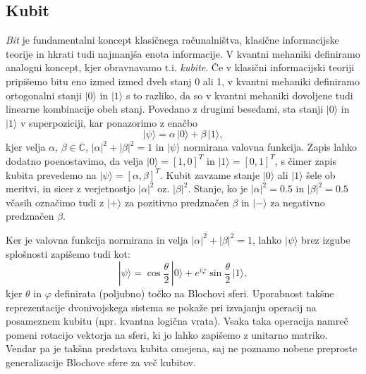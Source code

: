 \documentclass[12pt]{article}
\begin{document}
\subsection{Kubit}
\label{kubit} 

\emph{Bit} je fundamentalni koncept klasičnega računalništva, klasične informacijske teorije in hkrati tudi najmanjša enota informacije. V kvantni mehaniki definiramo analogni koncept, kjer obravnavamo t.i. \emph{kubite}. Če v klasični informacijski teoriji pripišemo bitu eno izmed izmed dveh stanj 0 ali 1, v kvantni mehaniki definiramo ortogonalni stanji $| 0 \rangle$ in $| 1 \rangle$ s to razliko, da so v kvantni mehaniki dovoljene tudi linearne kombinacije obeh stanj. Povedano z drugimi besedami, sta stanji $| 0 \rangle$ in $| 1 \rangle$ v superpoziciji, kar ponazorimo z enačbo
%
\begin{equation}
| \psi \rangle = \alpha \, | 0 \rangle + \beta \, | 1 \rangle,
\end{equation}
%
kjer velja $\alpha$, $\beta \in \mathbb{C}$, $|\alpha|^2 + |\beta|^2 = 1$ in $| \psi \rangle$ normirana valovna funkcija. Zapis lahko dodatno poenostavimo, da velja $| 0 \rangle = [1,0]^T$ in $| 1 \rangle = [0,1]^T$, s čimer zapis kubita prevedemo na $| \psi \rangle = [\alpha, \beta]^T$.  Kubit zavzame stanje $| 0 \rangle$ ali $| 1 \rangle$ šele ob meritvi, in sicer z verjetnostjo $|\alpha|^2$ oz. $|\beta|^2$. Stanje, ko je $|\alpha|^2 = 0.5$ in $|\beta|^2 = 0.5$ včasih označimo tudi z $| + \rangle$ za pozitivno predznačen $\beta$ in $| - \rangle$ za negativno predznačen $\beta$. \cite{nielsenQuantumComputationQuantum2012} \par Ker je valovna funkcija normirana in velja $|\alpha|^2 + |\beta|^2 = 1$, lahko $| \psi \rangle$ brez izgube splošnosti zapišemo tudi kot:
\begin{equation}
\label{blocheq}
| \psi \rangle = \cos{\frac{\theta}{2}} \, | 0 \rangle + e^{i \varphi} \sin{\frac{\theta}{2}} \, | 1 \rangle,
\end{equation}
kjer $\theta$ in $\varphi$ definirata (poljubno) točko na Blochovi sferi. Uporabnost takšne reprezentacije dvonivojskega sistema se pokaže pri izvajanju operacij na posameznem kubitu (npr. kvantna logična vrata). Vsaka taka operacija namreč pomeni rotacijo vektorja na sferi, ki jo lahko zapišemo z unitarno matriko. Vendar pa je takšna predstava kubita omejena, saj ne poznamo nobene preproste generalizacije Blochove sfere za več kubitov. \cite{nielsenQuantumComputationQuantum2012}

\par
\end{document}
